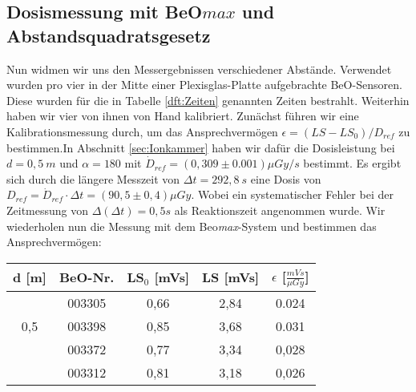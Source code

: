 \subsection{Dosismessung mit BeO$max$ und Abstandsquadratsgesetz}
Nun widmen wir uns den Messergebnissen verschiedener Abstände. Verwendet wurden pro vier in der Mitte einer Plexisglas-Platte aufgebrachte BeO-Sensoren. Diese wurden für die in Tabelle \ref{dft:Zeiten} genannten Zeiten bestrahlt. Weiterhin haben wir vier von ihnen von Hand kalibriert.
Zunächst führen wir eine Kalibrationsmessung durch, um das Ansprechvermögen $\epsilon = (LS - LS_0)/D_{ref}$ zu bestimmen.In Abschnitt \ref{sec:Ionkammer} haben wir dafür die Dosisleistung bei $d=0,5\ m$ und $\alpha = 180$ \textdegree  mit $\dot{D}_{ref} = (0,309 \pm 0.001)\mu Gy /s$ bestimmt. Es ergibt sich durch die längere Messzeit von $\Delta t = 292,8\ s$ eine Dosis von $D_{ref} = \dot{D}_{ref} \cdot \Delta t = (90,5 \pm 0,4)\mu Gy$. Wobei ein systematischer Fehler bei der Zeitmessung von $\Delta(\Delta t) = 0,5s$ als Reaktionszeit angenommen wurde. Wir wiederholen nun die Messung mit dem Beo\textit{max}-System und bestimmen das Ansprechvermögen:\\

\minipanf
	\begin{center}	
		\begin{tabular}{c|c|c|c|c}
					\textbf{d} [m] & BeO-Nr. & \textbf{LS$_0$} [mVs] & \textbf{LS} [mVs] & \textbf{$\epsilon$} [$\frac{mVs}{\mu Gy}$] \\
			\hline  
								& 003305 & 0,66 & 2,84 & 0.024\\
						0,5		& 003398 & 0,85 & 3,68 & 0.031\\
								& 003372 & 0,77 & 3,34 & 0,028\\
								& 003312 & 0,81 & 3,18 & 0,026\\								
		\end{tabular}
	\end{center}
\minipend
\vspace{3mm}

